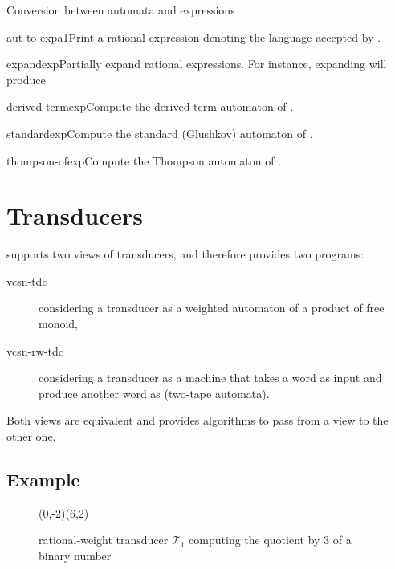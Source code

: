 \begin{fnsection}{Conversion between automata and expressions}
\item{aut-to-exp}{a1}{Print a rational expression denoting the
    language accepted by .}
\item{expand}{exp}{Partially expand rational expressions. For
    instance, expanding  will produce
    }
\item{derived-term}{exp}{Compute the derived term automaton of
    .}
\item{standard}{exp}{Compute the standard (Glushkov) automaton of
    .}
\item{thompson-of}{exp}{Compute the Thompson automaton of .}
  \hline
\end{fnsection}


\newpage
\section{Transducers}

\Vauc supports two views of transducers, and therefore provides two
programs:
\begin{description}
\item[vcsn-tdc] considering a transducer as a weighted automaton of a
  product of free monoid,
\item[vcsn-rw-tdc] considering a transducer as a machine that takes a
  word as input and produce another word as (two-tape automata).
\end{description}
Both views are equivalent and \Vauc provides algorithms to pass from a
view to the other one.

\subsection{Example}

\begin{figure}[tp]
  \begin{center}
    \begin{VCPicture}{(0,-2)(6,2)}
        
    \end{VCPicture}
    \caption{rational-weight transducer $\mathcal{T}_1$ computing the
      quotient by 3 of a binary number}
    \label{fig:t1}
  \end{center}
\end{figure}

